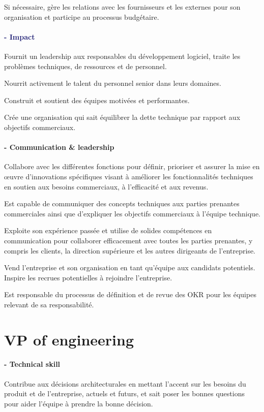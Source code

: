 \documentclass[a4paper, french, openany, 12pt]{book}
\newcommand\dex{\textcolor{BrickRed}{\textbf{\bsc{Dexterity} - Technical skill}}}
\newcommand\wis{\textcolor{MidnightBlue}{\textbf{\bsc{Wisdom} - Impact}}}
\newcommand\cha{\textcolor{RawSienna}{\textbf{\bsc{Charisma} - Communication \& leadership}}}
\begin{document}
Si nécessaire, gère les relations avec les fournisseurs et les externes pour son organisation et participe au processus 
budgétaire.

\subsubsection*{\wis}

Fournit un leadership aux responsables du développement logiciel, traite les problèmes techniques, de ressources et de 
personnel.

Nourrit activement le talent du personnel senior dans leurs domaines.

Construit et soutient des équipes motivées et performantes.

Crée une organisation qui sait équilibrer la dette technique par rapport aux objectifs commerciaux.

\subsubsection*{\cha}

Collabore avec les différentes fonctions pour définir, prioriser et assurer la mise en œuvre d'innovations spécifiques 
visant à améliorer les fonctionnalités techniques en soutien aux besoins commerciaux, à l'efficacité et aux revenus.

Est capable de communiquer des concepts techniques aux parties prenantes commerciales ainsi que d'expliquer les 
objectifs commerciaux à l'équipe technique.

Exploite son expérience passée et utilise de solides compétences en communication pour collaborer efficacement avec 
toutes les parties prenantes, y compris les clients, la direction supérieure et les autres dirigeants de l'entreprise.

Vend l'entreprise et son organisation en tant qu'équipe aux candidats potentiels. 
Inspire les recrues potentielles à rejoindre l'entreprise.

Est responsable du processus de définition et de revue des OKR pour les équipes relevant de sa responsabilité.

\chapter{VP of engineering}

\subsubsection*{\dex}
Contribue aux décisions architecturales en mettant l'accent sur les besoins du produit et de l'entreprise,
actuels et futurs, et sait poser les bonnes questions pour aider l'équipe à prendre la bonne décision.
\end{document}
